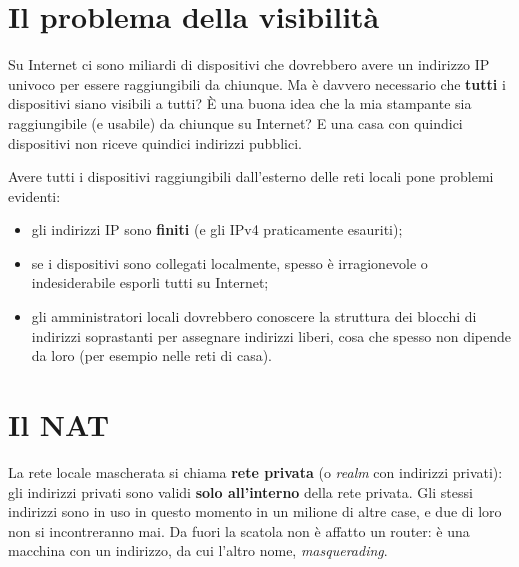 \section{Il problema della visibilità}

Su Internet ci sono miliardi di dispositivi che dovrebbero avere un indirizzo IP univoco per essere raggiungibili da
chiunque. Ma è davvero necessario che \textbf{tutti} i dispositivi siano visibili a tutti? È una buona idea che la mia
stampante sia raggiungibile (e usabile) da chiunque su Internet? E una casa con quindici dispositivi non riceve quindici
indirizzi pubblici.

Avere tutti i dispositivi raggiungibili dall'esterno delle reti locali pone problemi evidenti:

\begin{itemize}
    \item gli indirizzi IP sono \textbf{finiti} (e gli IPv4 praticamente esauriti);
    \item se i dispositivi sono collegati localmente, spesso è irragionevole o indesiderabile esporli tutti su Internet;
    \item gli amministratori locali dovrebbero conoscere la struttura dei blocchi di indirizzi soprastanti per assegnare
          indirizzi liberi, cosa che spesso non dipende da loro (per esempio nelle reti di casa).
\end{itemize}

\section{Il NAT}


La rete locale mascherata si chiama \textbf{rete privata} (o \emph{realm} con indirizzi privati): gli indirizzi privati
sono validi \textbf{solo all'interno} della rete privata. Gli stessi indirizzi sono in uso in questo momento in un milione di
altre case, e due di loro non si incontreranno mai. Da fuori la scatola non è affatto un router: è una macchina con un
indirizzo, da cui l'altro nome, \emph{masquerading}.

